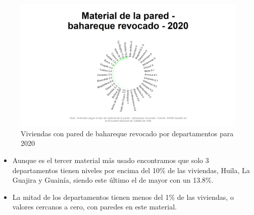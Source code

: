     \begin{figure}[H]
        \caption{Viviendas con pared de bahareque revocado por departamentos para 2020 \label{map_result_2} }
        \begin{center}
        \includegraphics[width=\textwidth,keepaspectratio]{img/var_154_static.png}
        \end{center}
    \end{figure}
            \begin{itemize}
                    \item Aunque es el tercer material más usado encontramos que solo 3 departamentos tienen niveles por encima del 10\% de las viviendas, Huila, La Guajira y Guainía, siendo este último el de mayor con un 13.8\%.
                    \item La mitad de los departamentos tienen menos del 1\% de las viviendas, o valores cercanos a cero, con paredes en este material.
                    \end{itemize}

